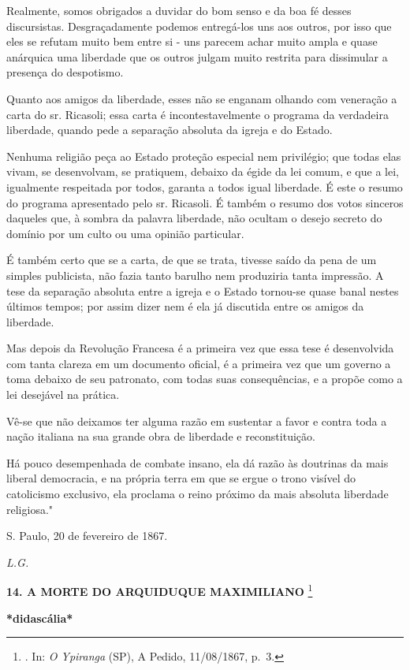 Realmente, somos obrigados a duvidar do bom senso e da boa fé desses
discursistas. Desgraçadamente podemos entregá-los uns aos outros, por
isso que eles se refutam muito bem entre si - uns parecem achar muito
ampla e quase anárquica uma liberdade que os outros julgam muito
restrita para dissimular a presença do despotismo.

Quanto aos amigos da liberdade, esses não se enganam olhando com
veneração a carta do sr. Ricasoli; essa carta é incontestavelmente o
programa da verdadeira liberdade, quando pede a separação absoluta da
igreja e do Estado.

Nenhuma religião peça ao Estado proteção especial nem privilégio; que
todas elas vivam, se desenvolvam, se pratiquem, debaixo da égide da lei
comum, e que a lei, igualmente respeitada por todos, garanta a todos
igual liberdade. É este o resumo do programa apresentado pelo sr.
Ricasoli. É também o resumo dos votos sinceros daqueles que, à sombra da
palavra liberdade, não ocultam o desejo secreto do domínio por um culto
ou uma opinião particular.

É também certo que se a carta, de que se trata, tivesse saído da pena de
um simples publicista, não fazia tanto barulho nem produziria tanta
impressão. A tese da separação absoluta entre a igreja e o Estado
tornou-se quase banal nestes últimos tempos; por assim dizer nem é ela
já discutida entre os amigos da liberdade.

Mas depois da Revolução Francesa é a primeira vez que essa tese é
desenvolvida com tanta clareza em um documento oficial, é a primeira vez
que um governo a toma debaixo de seu patronato, com todas suas
consequências, e a propõe como a lei desejável na prática.

Vê-se que não deixamos ter alguma razão em sustentar a favor e contra
toda a nação italiana na sua grande obra de liberdade e reconstituição.

Há pouco desempenhada de combate insano, ela dá razão às doutrinas da
mais liberal democracia, e na própria terra em que se ergue o trono
visível do catolicismo exclusivo, ela proclama o reino próximo da mais
absoluta liberdade religiosa."

S. Paulo, 20 de fevereiro de 1867.

\emph{L.G.}

\textbf{14. A MORTE DO ARQUIDUQUE MAXIMILIANO} \footnote{. In: \emph{O
  Ypiranga} (SP), A Pedido, 11/08/1867, p.~3.}

\textbf{*didascália*}

